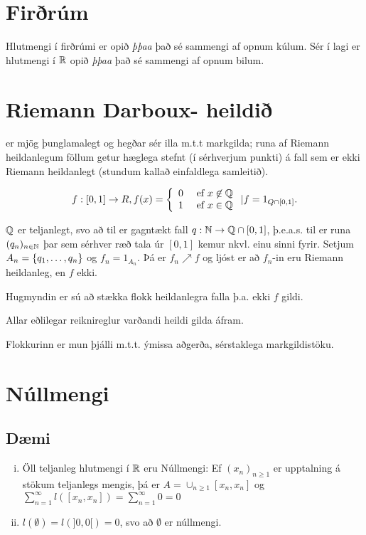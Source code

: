 \documentclass[12pt]{book}
\begin{document}
\section{Firðrúm}
Hlutmengi í firðrúmi er opið \emph{þþaa} það sé sammengi af opnum kúlum. Sér í lagi er hlutmengi í $\mathbb{R}$ opið \emph{þþaa} það sé sammengi af opnum bilum.

\section{Riemann Darboux- heildið}
er mjög þunglamalegt og hegðar sér illa m.t.t markgilda; runa af Riemann heildanlegum föllum getur hæglega stefnt (í sérhverjum punkti) á fall sem er ekki Riemann heildanlegt (stundum kallað einfaldlega samleitið).

\begin{daemi}
\[f: [0,1] \to R, f(x) = \left\{ \begin{array}{l l} 0 & \text{ ef } x \not\in \mathbb{Q} \\ 1 & \text{ ef } x \in \mathbb{Q} \end{array} \right.  | f = 1_{Q \cap [0,1]}. \]

$\mathbb{Q}$ er teljanlegt, svo að til er gagntækt fall $q: \mathbb{N} \to \mathbb{Q} \cap [0,1]$, þ.e.a.s. til er runa $(q_n)_{n \in \mathbb{N}}$ þar sem sérhver ræð tala úr $[0,1]$ kemur nkvl. einu sinni fyrir. Setjum $A_n = \{q_1, \dotsc, q_n\}$ og $f_n = 1_{A_n}$. Þá er $f_n \nearrow f$ og ljóst er að $f_n$-in eru Riemann heildanleg, en $f$ ekki.

Hugmyndin er sú að stækka flokk heildanlegra falla þ.a. ekki $f$ gildi.

Allar eðlilegar reiknireglur varðandi heildi gilda áfram.

Flokkurinn er mun þjálli m.t.t. ýmissa aðgerða, sérstaklega markgildistöku.
\end{daemi}

\section{Núllmengi}
\subsection{Dæmi}
\begin{enumerate}[i)]
\item Öll teljanleg hlutmengi í $\mathbb{R}$ eru Núllmengi: Ef $(x_n)_{n \geq 1}$ er upptalning á stökum teljanlegs mengis, þá er $A = \cup_{n \geq 1} [x_n, x_n]$ og $\sum_{n = 1}^{\infty} l([x_n,x_n]) = \sum_{n=1}^{\infty} 0 = 0$
\item $l(\emptyset) = l(]0,0[) = 0$, svo að $\emptyset$ er núllmengi.
\end{enumerate}
\end{document}
